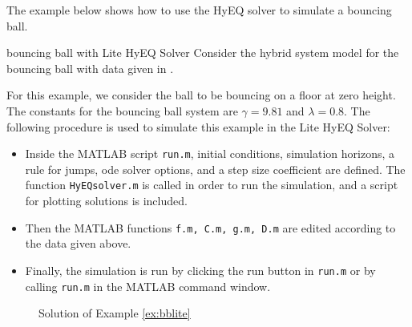 The example below shows how to use the HyEQ solver to simulate a bouncing ball.

\begin{example}{bouncing ball with Lite HyEQ Solver}
\label{ex:bblite} Consider the hybrid system model for the bouncing ball with data given in .

For this example, we consider the ball to be bouncing on a floor at zero height. The constants for the bouncing ball system are $\gamma = 9.81$ and $\lambda=0.8$.
The following procedure is used to simulate this example in the Lite HyEQ Solver:
\begin{itemize}
\item Inside the MATLAB script {\tt run.m}, initial conditions, simulation horizons, a rule for jumps, ode solver options, and a step size coefficient are defined. The function {\tt HyEQsolver.m} is called in order to run the simulation, and a script for plotting solutions is included.
\item Then the MATLAB functions {\tt f.m, C.m, g.m, D.m} are edited according to the data given above.
\item Finally, the simulation is run by clicking the run button in {\tt run.m} or by calling {\tt run.m} in the MATLAB command window.
\end{itemize}

\begin{figure}[ht]
\begin{center}
\hfill
{}
\end{center}
\caption{Solution of Example \ref{ex:bblite}
}
\end{figure}


\end{example}

